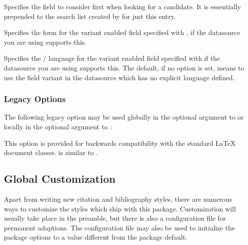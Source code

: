 \documentclass{ltxdockit}[2011/03/25]
\begin{document}
\begin{optionlist}

Specifies the field to consider first when looking for a  candidate. It is essentially prepended to the search list created by  for just this entry.


Specifies the form for the variant enabled field specified with , if the datasource you are using supports this.


Specifies the / language for the variant enabled field specified with  if the datasource you are using supports this. The default, if no  option is set, means to use the field variant in the datasource which has no explicit language defined.

\end{optionlist}

\subsubsection{Legacy Options}

The following legacy option may be used globally in the optional argument to  or locally in the optional argument to :

\begin{optionlist}

\DeprecatedMark  This option is provided for backwards compatibility with the standard LaTeX document classes.  is similar to .

\end{optionlist}

\subsection{Global Customization}
\label{use:cfg}

Apart from writing new citation and bibliography styles, there are numerous ways to customize the styles which ship with this package. Customization will usually take place in the preamble, but there is also a configuration file for permanent adaptions. The configuration file may also be used to initialize the package options to a value different from the package default.
\end{document}
